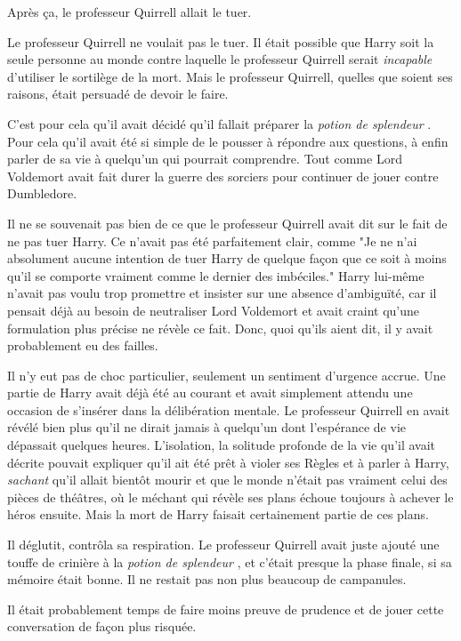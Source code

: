 Après ça, le professeur Quirrell allait le tuer.

Le professeur Quirrell ne voulait pas le tuer. Il était possible que Harry soit la seule personne au monde contre laquelle le professeur Quirrell serait \emph{incapable}  d'utiliser le sortilège de la mort. Mais le professeur Quirrell, quelles que soient ses raisons, était persuadé de devoir le faire.

C'est pour cela qu'il avait décidé qu'il fallait préparer la \emph{potion de splendeur} . Pour cela qu'il avait été si simple de le pousser à répondre aux questions, à enfin parler de sa vie à quelqu'un qui pourrait comprendre. Tout comme Lord Voldemort avait fait durer la guerre des sorciers pour continuer de jouer contre Dumbledore.

Il ne se souvenait pas bien de ce que le professeur Quirrell avait dit sur le fait de ne pas tuer Harry. Ce n'avait pas été parfaitement clair, comme "Je ne n'ai absolument aucune intention de tuer Harry de quelque façon que ce soit à moins qu'il se comporte vraiment comme le dernier des imbéciles." Harry lui-même n'avait pas voulu trop promettre et insister sur une absence d'ambiguïté, car il pensait déjà au besoin de neutraliser Lord Voldemort et avait craint qu'une formulation plus précise ne révèle ce fait. Donc, quoi qu'ils aient dit, il y avait probablement eu des failles.

Il n'y eut pas de choc particulier, seulement un sentiment d'urgence accrue. Une partie de Harry avait déjà été au courant et avait simplement attendu une occasion de s'insérer dans la délibération mentale. Le professeur Quirrell en avait révélé bien plus qu'il ne dirait jamais à quelqu'un dont l'espérance de vie dépassait quelques heures. L'isolation, la solitude profonde de la vie qu'il avait décrite pouvait expliquer qu'il ait été prêt à violer ses Règles et à parler à Harry, \emph{sachant}  qu'il allait bientôt mourir et que le monde n'était pas vraiment celui des pièces de théâtres, où le méchant qui révèle ses plans échoue toujours à achever le héros ensuite. Mais la mort de Harry faisait certainement partie de ces plans.

Il déglutit, contrôla sa respiration. Le professeur Quirrell avait juste ajouté une touffe de crinière à la \emph{potion de splendeur} , et c'était presque la phase finale, si sa mémoire était bonne. Il ne restait pas non plus beaucoup de campanules.

Il était probablement temps de faire moins preuve de prudence et de jouer cette conversation de façon plus risquée.

